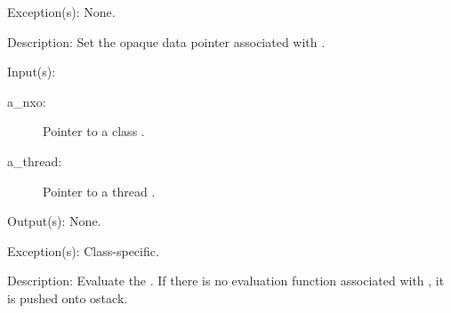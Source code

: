 \begin{capi}
\begin{capilist}
	\item[Exception(s): ] None.
	\item[Description: ]
		Set the opaque data pointer associated with .
	\end{capilist}
\label{nxo_class_eval}
	\begin{capilist}
	\item[Input(s): ]
		\begin{description}\item[]
		\item[a\_nxo: ]
			Pointer to a class .
		\item[a\_thread: ]
			Pointer to a thread .
		\end{description}
	\item[Output(s): ] None.
	\item[Exception(s): ] Class-specific.
	\item[Description: ]
		Evaluate the .  If there is no evaluation function
		associated with , it is pushed onto ostack.
	\end{capilist}
\end{capi}
